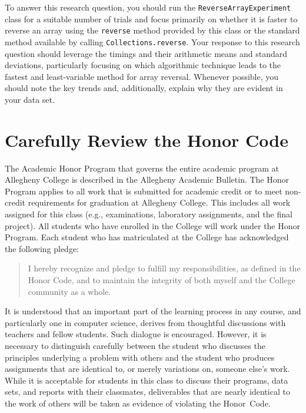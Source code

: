  To answer this research question, you should run the {\tt ReverseArrayExperiment} class for a suitable number
of trials and focus primarily on whether it is faster to reverse an array using the {\tt reverse} method provided by
this class or the standard method available by calling {\tt Collections.reverse}.  Your response to this research
question should leverage the timings and their arithmetic means and standard deviations, particularly focusing on which
algorithmic technique leads to the fastest and least-variable method for array reversal. Whenever possible, you should
note the key trends and, additionally, explain why they are evident in your data set.

\section*{Carefully Review the Honor Code}

The Academic Honor Program that governs the entire academic program at Allegheny College is described in the Allegheny
Academic Bulletin.  The Honor Program applies to all work that is submitted for academic credit or to meet non-credit
requirements for graduation at Allegheny College.  This includes all work assigned for this class (e.g., examinations,
  laboratory assignments, and the final project).  All students who have enrolled in the College will work under the Honor
Program.  Each student who has matriculated at the College has acknowledged the following pledge:

\vspace*{-.1in}
\begin{quote}
  I hereby recognize and pledge to fulfill my responsibilities, as defined in the Honor Code, and to maintain the
  integrity of both myself and the College community as a whole.
\end{quote}
\vspace*{-.1in}

\noindent It is understood that an important part of the learning process in any course, and particularly one in
computer science, derives from thoughtful discussions with teachers and fellow students.  Such dialogue is encouraged.
However, it is necessary to distinguish carefully between the student who discusses the principles underlying a problem
with others and the student who produces assignments that are identical to, or merely variations on, someone else's
work.  While it is acceptable for students in this class to discuss their programs, data sets, and reports with their
classmates, deliverables that are nearly identical to the work of others will be taken as evidence of violating the
\mbox{Honor Code}.

